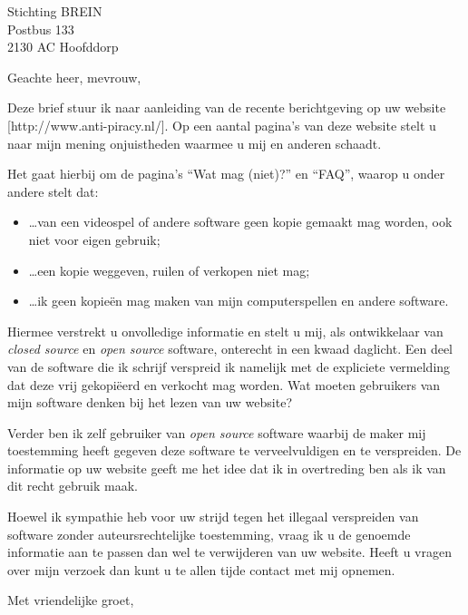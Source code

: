 \documentclass[a4paper,11pt]{brief}
\date{22 februari 2006}
\begin{document}
\begin{letter}{Stichting BREIN\\
Postbus 133\\
2130 AC Hoofddorp}

\opening{Geachte heer, mevrouw,}

Deze brief stuur ik naar aanleiding van de recente berichtgeving op
uw website [http://www.anti-piracy.nl/]. Op een aantal pagina's van
deze website stelt u naar mijn mening onjuistheden waarmee u mij en
anderen schaadt.

Het gaat hierbij om de pagina's ``Wat mag (niet)?'' en ``FAQ'', waarop
u onder andere stelt dat:

\begin{itemize}
\item \ldots van een videospel of andere software geen kopie gemaakt mag
worden, ook niet voor eigen gebruik;
\item \ldots een kopie weggeven, ruilen of verkopen niet mag;
\item \ldots ik geen kopie\"en mag maken van mijn computerspellen en andere
software.
\end{itemize}

Hiermee verstrekt u onvolledige informatie en stelt u mij, als
ontwikkelaar van \emph{closed source} en \emph{open source} software,
onterecht in een kwaad daglicht. Een deel van de software die ik
schrijf verspreid ik namelijk met de expliciete vermelding dat deze
vrij gekopi\"eerd en verkocht mag worden. Wat moeten gebruikers van
mijn software denken bij het lezen van uw website?

Verder ben ik zelf gebruiker van \emph{open source} software waarbij
de maker mij toestemming heeft gegeven deze software te
verveelvuldigen en te verspreiden. De informatie op uw website geeft
me het idee dat ik in overtreding ben als ik van dit recht gebruik
maak.

Hoewel ik sympathie heb voor uw strijd tegen het illegaal verspreiden
van software zonder auteursrechtelijke toestemming, vraag ik u de
genoemde informatie aan te passen dan wel te verwijderen van uw
website. Heeft u vragen over mijn verzoek dan kunt u te allen tijde
contact met mij opnemen.

\closing{Met vriendelijke groet,}

\end{letter}
\end{document}
